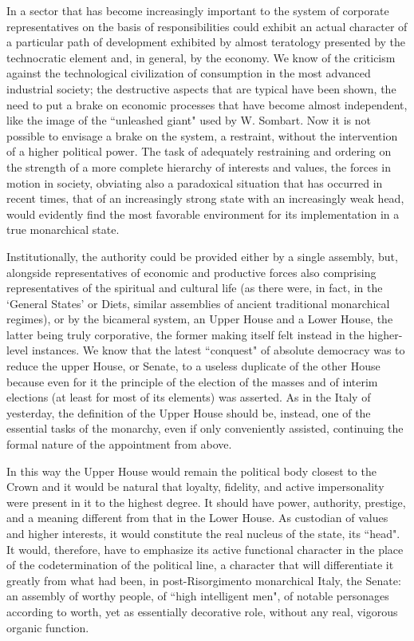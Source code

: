 In a sector that has become increasingly important to the system of corporate representatives on the basis of responsibilities could exhibit an actual character of a particular path of development exhibited by almost teratology presented by the technocratic element and, in general, by the economy. We know of the criticism against the technological civilization of consumption in the most advanced industrial society; the destructive aspects that are typical have been shown, the need to put a brake on economic processes that have become almost independent, like the image of the ``unleashed giant" used by W. Sombart. Now it is not possible to envisage a brake on the system, a restraint, without the intervention of a higher political power. The task of adequately restraining and ordering on the strength of a more complete hierarchy of interests and values, the forces in motion in society, obviating also a paradoxical situation that has occurred in recent times, that of an increasingly strong state with an increasingly weak head, would evidently find the most favorable environment for its implementation in a true monarchical state.

Institutionally, the authority could be provided either by a single assembly, but, alongside representatives of economic and productive forces also comprising representatives of the spiritual and cultural life (as there were, in fact, in the `General States' or Diets, similar assemblies of ancient traditional monarchical regimes), or by the bicameral system, an Upper House and a Lower House, the latter being truly corporative, the former making itself felt instead in the higher-level instances. We know that the latest ``conquest" of absolute democracy was to reduce the upper House, or Senate, to a useless duplicate of the other House because even for it the principle of the election of the masses and of interim elections (at least for most of its elements) was asserted. As in the Italy of yesterday, the definition of the Upper House should be, instead, one of the essential tasks of the monarchy, even if only conveniently assisted, continuing the formal nature of the appointment from above.

In this way the Upper House would remain the political body closest to the Crown and it would be natural that loyalty, fidelity, and active impersonality were present in it to the highest degree. It should have power, authority, prestige, and a meaning different from that in the Lower House. As custodian of values and higher interests, it would constitute the real nucleus of the state, its ``head". It would, therefore, have to emphasize its active functional character in the place of the codetermination of the political line, a character that will differentiate it greatly from what had been, in post-Risorgimento monarchical Italy, the Senate: an assembly of worthy people, of ``high intelligent men", of notable personages according to worth, yet as essentially decorative role, without any real, vigorous organic function.

